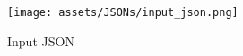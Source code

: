 \begin{figure}[t!]
    \centering
    \noindent
    \texttt{[image: assets/JSONs/input\_json.png]}
    \caption{Input JSON}
    \label{fig:input_json_example}
\end{figure}